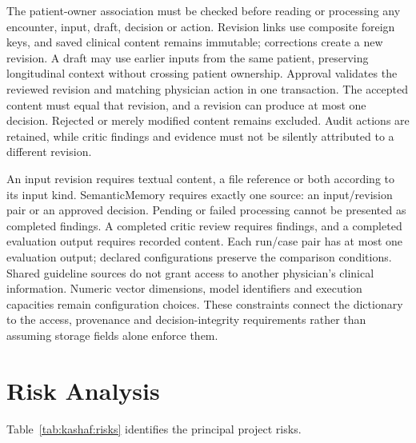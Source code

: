 \clearpage
The patient-owner association must be checked before reading or processing any encounter, input, draft, decision or action. Revision links use composite foreign keys, and saved clinical content remains immutable; corrections create a new revision. A draft may use earlier inputs from the same patient, preserving longitudinal context without crossing patient ownership. Approval validates the reviewed revision and matching physician action in one transaction. The accepted content must equal that revision, and a revision can produce at most one decision. Rejected or merely modified content remains excluded. Audit actions are retained, while critic findings and evidence must not be silently attributed to a different revision.

An input revision requires textual content, a file reference or both according to its input kind. SemanticMemory requires exactly one source: an input/revision pair or an approved decision. Pending or failed processing cannot be presented as completed findings. A completed critic review requires findings, and a completed evaluation output requires recorded content. Each run/case pair has at most one evaluation output; declared configurations preserve the comparison conditions. Shared guideline sources do not grant access to another physician's clinical information. Numeric vector dimensions, model identifiers and execution capacities remain configuration choices. These constraints connect the dictionary to the access, provenance and decision-integrity requirements rather than assuming storage fields alone enforce them.

\clearpage
\section{ Risk Analysis}
Table~\ref{tab:kashaf:risks} identifies the principal project risks.

